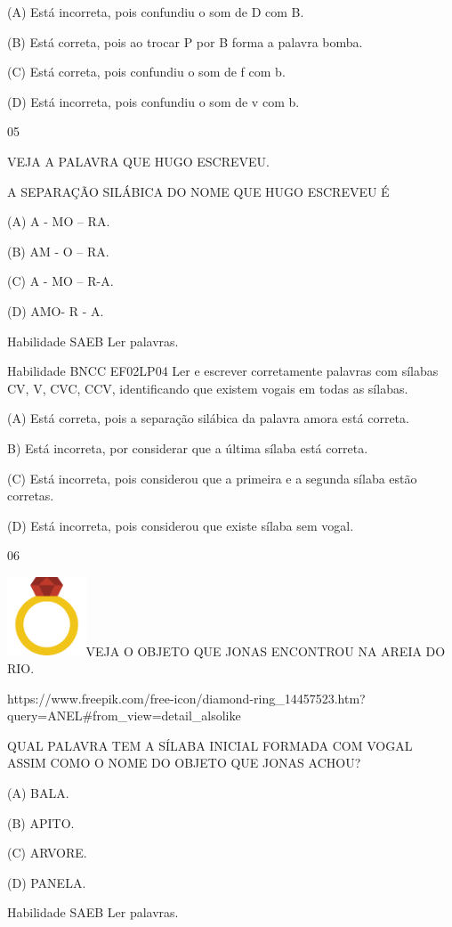 {{{{{{(A) Está incorreta, pois confundiu o som de D com B.

(B) Está correta, pois ao trocar P por B forma a palavra bomba.

(C) Está correta, pois confundiu o som de f com b.

(D) Está incorreta, pois confundiu o som de v com b.

\num{05}

VEJA A PALAVRA QUE HUGO ESCREVEU.

A SEPARAÇÃO SILÁBICA DO NOME QUE HUGO ESCREVEU É

(A) A - MO -- RA.

(B) AM - O -- RA.

(C) A - MO -- R-A.

(D) AMO- R - A.

\protect\hypertarget{_Hlk129375756}{}{}Habilidade SAEB Ler palavras.

Habilidade BNCC EF02LP04 Ler e escrever corretamente palavras com
sílabas CV, V, CVC, CCV, identificando que existem vogais em todas as
sílabas.

(A) Está correta, pois a separação silábica da palavra amora está
correta.

B) Está incorreta, por considerar que a última sílaba está correta.

(C) Está incorreta, pois considerou que a primeira e a segunda sílaba
estão corretas.

(D) Está incorreta, pois considerou que existe sílaba sem vogal.

\num{06}

\includegraphics[width=0.92222in,height=0.92222in]{media/image151.png}VEJA
O OBJETO QUE JONAS ENCONTROU NA AREIA DO RIO.

https://www.freepik.com/free-icon/diamond-ring\_14457523.htm?query=ANEL\#from\_view=detail\_alsolike

QUAL PALAVRA TEM A SÍLABA INICIAL FORMADA COM VOGAL ASSIM COMO O NOME DO
OBJETO QUE JONAS ACHOU?

(A) BALA.

(B) APITO.

(C) ARVORE.

(D) PANELA.

Habilidade SAEB Ler palavras.

}}}}}}
